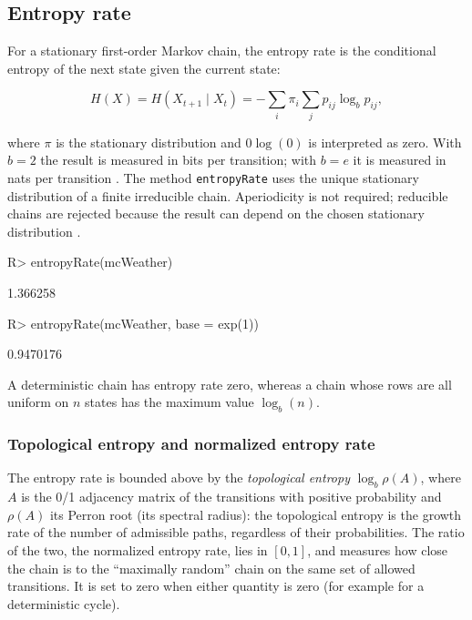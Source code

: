 \documentclass[
  nojss]{jss}
\begin{document}
\subsection{Entropy rate}\label{entropy-rate}

For a stationary first-order Markov chain, the entropy rate is the conditional
entropy of the next state given the current state:

\[
H(X) = H(X_{t+1}\mid X_t)
     = -\sum_i \pi_i\sum_j p_{ij}\log_b p_{ij},
\]

where \(\pi\) is the stationary distribution and \(0\log(0)\) is interpreted as
zero. With \(b=2\) the result is measured in bits per transition; with \(b=e\) it
is measured in nats per transition \citep{coverThomas2006}. The method
\texttt{entropyRate} uses the unique stationary distribution of a finite irreducible
chain. Aperiodicity is not required; reducible chains are rejected because the
result can depend on the chosen stationary distribution
\citep{strelioff2007inferring}.

\begin{CodeChunk}
\begin{CodeInput}
R> entropyRate(mcWeather)
\end{CodeInput}
\begin{CodeOutput}
[1] 1.366258
\end{CodeOutput}
\begin{CodeInput}
R> entropyRate(mcWeather, base = exp(1))
\end{CodeInput}
\begin{CodeOutput}
[1] 0.9470176
\end{CodeOutput}
\end{CodeChunk}

A deterministic chain has entropy rate zero, whereas a chain whose rows are all
uniform on \(n\) states has the maximum value \(\log_b(n)\).

\subsubsection{Topological entropy and normalized entropy rate}\label{topological-entropy-and-normalized-entropy-rate}

The entropy rate is bounded above by the \emph{topological entropy}
\(\log_b\rho(A)\), where \(A\) is the 0/1 adjacency matrix of the transitions with
positive probability and \(\rho(A)\) its Perron root (its spectral radius): the
topological entropy is the growth rate of the number of admissible paths,
regardless of their probabilities. The ratio of the two, the normalized
entropy rate, lies in \([0,1]\), and measures how close the chain is to the
``maximally random'' chain on the same set of allowed transitions. It is
set to zero when either quantity is zero (for example for a deterministic
cycle).
\end{document}
